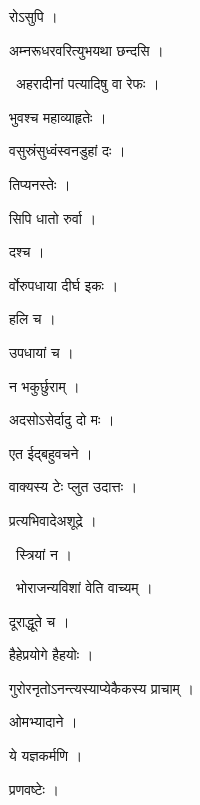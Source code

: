 \documentclass[10pt, openany, oneside]{book}
\begin{document}
\noindent रोऽसुपि ।

\noindent अम्नरूधरवरित्युभयथा छन्दसि ।

\par\noindent\hspace{1.5em}{\vps वा॰}~{\qt अहरादीनां पत्यादिषु वा रेफः ।}

\noindent भुवश्च महाव्याहृतेः ।

\noindent वसुस्रंसुध्वंस्वनडुहां दः ।

\noindent तिप्यनस्तेः ।

\noindent सिपि धातो रुर्वा ।

\noindent दश्च ।

\noindent र्वोरुपधाया दीर्घ इकः ।

\noindent हलि च ।

\noindent उपधायां च ।

\noindent न भकुर्छुराम् ।

\noindent अदसोऽसेर्दादु दो मः ।

\noindent एत ईद्बहुवचने ।

\noindent वाक्यस्य टेः प्लुत उदात्तः ।

\noindent प्रत्यभिवादेअशूद्रे ।

\par\noindent\hspace{1.5em}{\vps वा॰}~{\qt स्त्रियां न ।}

\par\noindent\hspace{1.5em}{\vps वा॰}~{\qt भोराजन्यविशां वेति वाच्यम् ।}

\noindent दूराद्धूते च ।

\noindent हैहेप्रयोगे हैहयोः ।

\noindent गुरोरनृतोऽनन्त्यस्याप्येकैकस्य प्राचाम् ।

\noindent ओमभ्यादाने ।

\noindent ये यज्ञकर्मणि ।

\noindent प्रणवष्टेः ।
\end{document}
